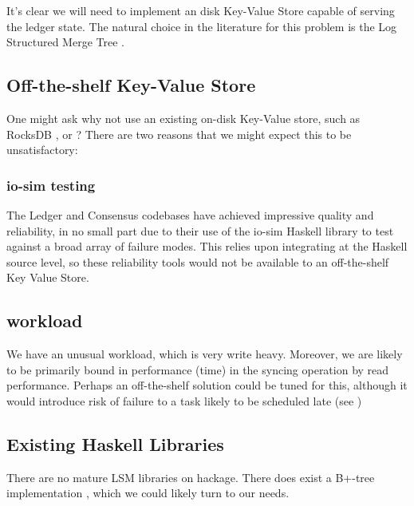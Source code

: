 \documentclass[11pt,a4paper]{article}
\begin{document}
It's clear we will need to implement an disk Key-Value Store capable of serving
the ledger state. The natural choice in the literature for this problem is the Log Structured Merge Tree . 

\subsection{Off-the-shelf Key-Value Store}


One might ask why not use an existing on-disk Key-Value store, such as
RocksDB , or ? There are two
reasons that we might expect this to be unsatisfactory:

\subsubsection{io-sim testing}
The Ledger and Consensus codebases have achieved impressive quality
and reliability, in no small part due to their use of the io-sim
Haskell library to test against a broad array of failure modes. This
relies upon integrating at the Haskell source level, so these
reliability tools would not be available to an off-the-shelf Key Value
Store.

\subsection{workload}
We have an unusual workload, which is very write heavy. Moreover, we are likely
to be primarily bound in performance (time) in the syncing operation by read
performance. Perhaps an off-the-shelf solution could be tuned for this, although
it would introduce risk of failure to a task likely to be scheduled late (see )

\subsection{Existing Haskell Libraries}

There are no mature LSM libraries on hackage. There does exist a B+-tree
implementation ,
which we could likely turn to our needs.
\end{document}
